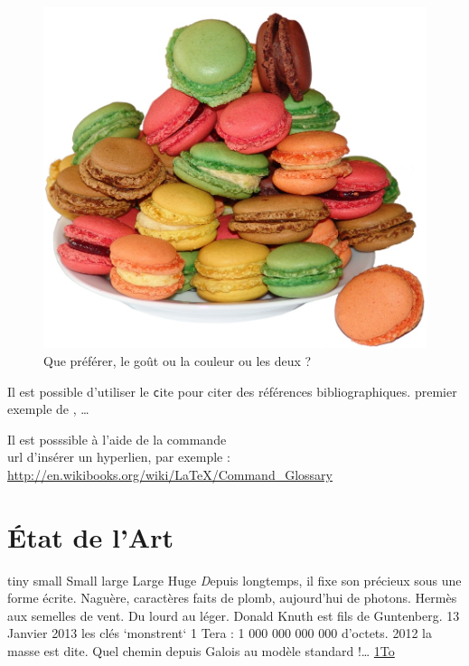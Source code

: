 \documentclass[twocolumn,a4paper]{IEEEtranfr}
\begin{document}
\begin{figure}[htpb]
  \begin{center}
    \includegraphics[width=\columnwidth] {gouts.jpg}
  \end{center}
  \caption{Que préférer, le goût ou la couleur ou les deux ?  }
  \label{fig:gouts}
\end{figure}

Il est possible d'utiliser le {\texttt cite} pour citer des références
bibliographiques. 
premier exemple de \cite{akgu07},\cite{akgu091}\cite{zwic00} \ldots

Il est posssible à l'aide de la commande {\texttt \\url{}} d'insérer un
hyperlien, par exemple : \url{http://en.wikibooks.org/wiki/LaTeX/Command_Glossary}

\section{État de l'Art} 
{\tiny tiny \small small \Small Small \large large \Large Large \Huge Huge}
{\textit
Depuis longtemps, il fixe son précieux sous une forme écrite.
Naguère, caractères faits de plomb, aujourd'hui de photons. Hermès aux semelles de vent. Du lourd au léger.  
Donald Knuth est fils de Guntenberg. 13 Janvier 2013 les clés `monstrent`  1 Tera : 1 000 000 000 000 d'octets. 
2012 la masse est dite. Quel chemin depuis Galois au modèle standard !\dots
}
\href{http://micro.lemondeinformatique.fr/nouveaux-produits/lire-datatraveler-hyperx-predator-19600.html}{1To}
\end{document}

